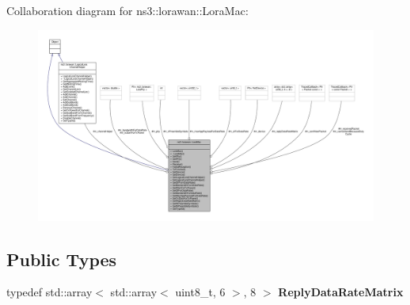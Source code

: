 Collaboration diagram for ns3\+:\+:lorawan\+:\+:Lora\+Mac\+:
\nopagebreak
\begin{figure}[H]
\begin{center}
\leavevmode
\includegraphics[width=350pt]{classns3_1_1lorawan_1_1LoraMac__coll__graph}
\end{center}
\end{figure}
\subsection*{Public Types}
\begin{DoxyCompactItemize}
\item 
\mbox{\label{classns3_1_1lorawan_1_1LoraMac_af23a473da8e20faebc278e599c6e4a46}} 
typedef std\+::array$<$ std\+::array$<$ uint8\+\_\+t, 6 $>$, 8 $>$ {\bfseries Reply\+Data\+Rate\+Matrix}
\end{DoxyCompactItemize}
